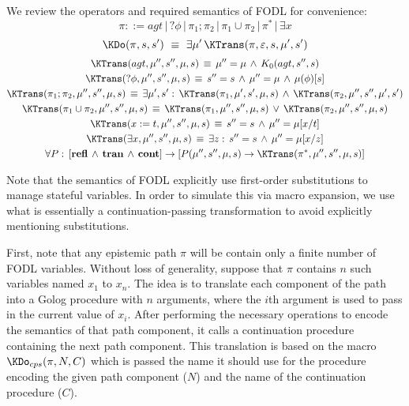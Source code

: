 We review the operators and required semantics of FODL for convenience:\[
\pi::=agt\,|\,?\phi\,|\,\pi_{1};\pi_{2}\,|\,\pi_{1}\cup\pi_{2}\,|\,\pi^{*}\,|\,\exists x\]
\[
\KDo(\pi,s,s')\,\,\equiv\,\,\exists\mu'\,\KTrans(\pi,\varepsilon,s,\mu',s')\]
\begin{gather*}
\KTrans(agt,\mu'',s'',\mu,s)\,\equiv\,\mu''=\mu\,\wedge\, K_{0}(agt,s'',s)\\
\KTrans(?\phi,\mu'',s'',\mu,s)\,\equiv\, s''=s\,\wedge\,\mu''=\mu\,\wedge\,\mu(\phi)[s]\\
\KTrans(\pi_{1};\pi_{2},\mu'',s'',\mu,s)\,\equiv\,\exists\mu',s':\,\KTrans(\pi_{1},\mu',s',\mu,s)\,\wedge\,\KTrans(\pi_{2},\mu'',s'',\mu',s')\\
\KTrans(\pi_{1}\cup\pi_{2},\mu'',s'',\mu,s)\,\equiv\,\KTrans(\pi_{1},\mu'',s'',\mu,s)\,\vee\,\KTrans(\pi_{2},\mu'',s'',\mu,s)\\
\KTrans(x:=t,\mu'',s'',\mu,s)\,\equiv\, s''=s\,\wedge\,\mu''=\mu[x/t]\\
\KTrans(\exists x,\mu'',s'',\mu,s)\,\equiv\,\exists z:\, s''=s\,\wedge\,\mu''=\mu[x/z]\\
\forall P:\,\left[\mathbf{refl}\,\wedge\,\mathbf{tran}\,\wedge\,\mathbf{cont}\right]\rightarrow\left[P(\mu'',s'',\mu,s)\rightarrow\KTrans(\pi^{*},\mu'',s'',\mu,s)\right]\end{gather*}


Note that the semantics of FODL explicitly use first-order substitutions
to manage stateful variables. In order to simulate this via macro
expansion, we use what is essentially a continuation-passing transformation
to avoid explicitly mentioning substitutions.

First, note that any epistemic path $\pi$ will be contain only a
finite number of FODL variables. Without loss of generality, suppose
that $\pi$ contains $n$ such variables named $x_{1}$ to $x_{n}$.
The idea is to translate each component of the path into a Golog procedure
with $n$ arguments, where the $i$th argument is used to pass in
the current value of $x_{i}$. After performing the necessary operations
to encode the semantics of that path component, it calls a continuation
procedure containing the next path component. This translation is
based on the macro $\KDo_{cps}(\pi,N,C)$ which is passed the name
it should use for the procedure encoding the given path component
($N$) and the name of the continuation procedure ($C$).

